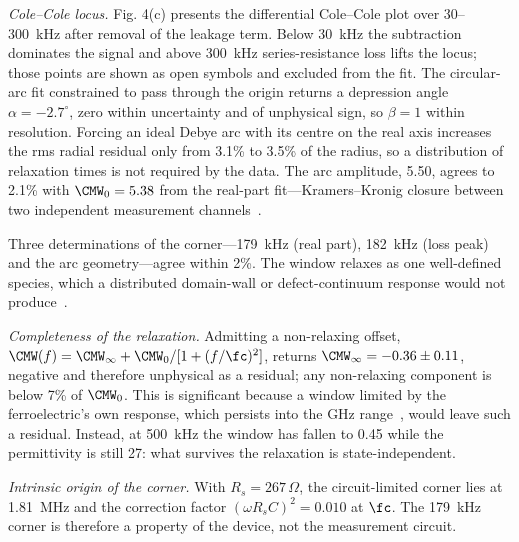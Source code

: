 \textit{Cole--Cole locus.} Fig. 4(c) presents the
differential Cole--Cole plot over 30--300~kHz after removal of the leakage
term. Below 30~kHz the subtraction dominates the signal and above 300~kHz
series-resistance loss lifts the locus; those points are shown as open
symbols and excluded from the fit. The circular-arc fit constrained to pass
through the origin returns a depression angle $\alpha = -2.7^\circ$, zero
within uncertainty and of unphysical sign, so $\beta = 1$ within resolution.
Forcing an ideal Debye arc with its centre on the real axis increases the rms
radial residual only from 3.1\% to 3.5\% of the radius, so a distribution of
relaxation times is not required by the data. The arc amplitude, 5.50, agrees
to 2.1\% with $\CMW_0 = 5.38$ from the real-part fit---Kramers--Kronig
closure between two independent measurement channels~\cite{colecole1941}.

Three determinations of the corner---179~kHz (real part), 182~kHz (loss peak)
and the arc geometry---agree within 2\%. The window relaxes as one
well-defined species, which a distributed domain-wall or defect-continuum
response would not produce~\cite{jonscher1977,jonscher1983}.

\textit{Completeness of the relaxation.} Admitting a non-relaxing offset,
$\CMW(f) = \CMW_\infty + \CMW_0/[1+(f/\fc)^2]$, returns
$\CMW_\infty = -0.36 \pm 0.11$, negative and therefore unphysical as a
residual; any non-relaxing component is below 7\% of $\CMW_0$. This is
significant because a window limited by the ferroelectric's own response,
which persists into the GHz range~\cite{kim2023impedance}, would leave such a
residual. Instead, at 500~kHz the window has fallen to 0.45 while the
permittivity is still 27: what survives the relaxation is state-independent.

\textit{Intrinsic origin of the corner.} With $R_s = 267\,\Omega$, the
circuit-limited corner lies at 1.81~MHz and the correction factor
$(\omega R_s C)^2 = 0.010$ at $\fc$. The 179~kHz corner is therefore a
property of the device, not the measurement circuit.

